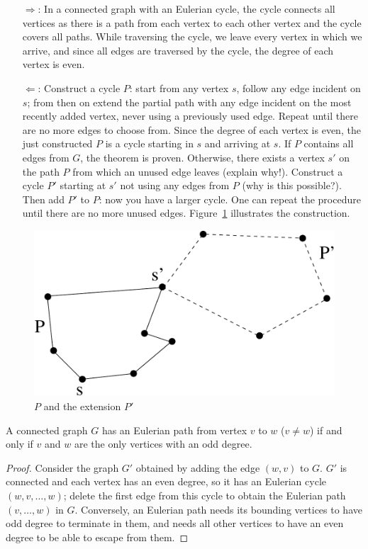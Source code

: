 \begin{proof*}
\begin{itemize}
\item[\underline{$\Rightarrow$}:] In a connected graph with an Eulerian cycle, the cycle connects all
vertices as there is a path from each vertex to each other vertex and the cycle
covers all paths. While traversing the cycle, we leave every vertex in which we
arrive, and since all edges are traversed by the cycle, the degree of each
vertex is even.

\item[\underline{$\Leftarrow$}:] Construct a cycle $P$: start from any vertex $s$, follow any
edge incident on $s$; from then on extend the partial path with any
edge incident on the most recently added vertex, never using a
previously used edge. Repeat until there are no more edges to choose
from. Since the degree of each vertex is even, the just constructed
$P$ is a cycle starting in $s$ and arriving at $s$. If $P$ contains
all edges from $G$, the theorem is proven. Otherwise, there exists a
vertex $s'$ on the path $P$ from which an unused edge leaves (explain
why!). Construct a cycle $P'$ starting at $s'$ not using any edges
from $P$ (why is this possible?). Then add $P'$ to $P$: now you have a
larger cycle. One can repeat the procedure until there are no more
unused edges. Figure~\ref{euler4} illustrates the construction.
\end{itemize}
\begin{figure}[ht]
	\centering
	\includegraphics[width=0.4\linewidth,keepaspectratio]{euler4}
	\caption{ $P$ and the extension $P'$ \label{euler4}}
\end{figure}
\end{proof*}

\begin{theorem}
  A connected graph $G$ has an Eulerian path from vertex $v$ to $w$
  ($v \neq w$) if and only if $v$ and $w$ are the only vertices with an odd degree.
\end{theorem}
\begin{proof}
Consider the graph $G'$ obtained by adding the edge $(w,v)$ to $G$.
$G'$ is connected and each vertex has an even degree, so it has an
Eulerian cycle $(w,v,\ldots,w)$; delete the first edge from this cycle
to obtain the Eulerian path $(v,\ldots,w)$ in $G$. Conversely, an Eulerian path needs its bounding vertices to have odd degree to terminate in them, and needs all other vertices to have an even degree to be able to escape from them.
\end{proof}

